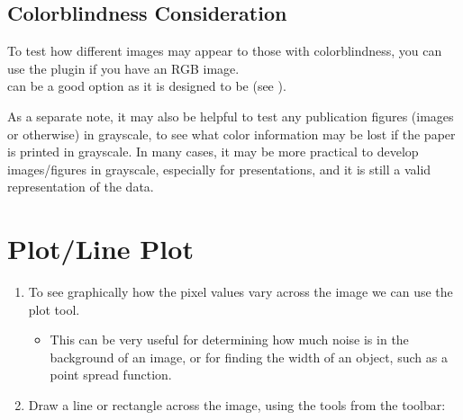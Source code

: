 \documentclass[letterpaper,10pt,english]{jupyterBook}
\begin{document}
\subsection{Colorblindness Consideration}
\label{\detokenize{basics:colorblindness-consideration}}
\sphinxAtStartPar
To test how different images may appear to those with colorblindness, you can use the  plugin if you have an RGB image.\\
 can be a good option as it is designed to be  (see ).

\sphinxAtStartPar
As a separate note, it may also be helpful to test any publication figures (images or
otherwise) in grayscale, to see what color information may be lost if the paper is printed in
grayscale.  In many cases, it may be more practical to develop images/figures in grayscale,
especially for presentations, and it is still a valid representation of the data.


\section{Plot/Line Plot}
\label{\detokenize{basics:plot-line-plot}}\begin{enumerate}
%
\item {} 
\sphinxAtStartPar
To see graphically how the pixel values vary across the image we can use the plot tool.
\begin{itemize}
\item {} 
\sphinxAtStartPar
This can be very useful for determining how much noise is in the background of an
image, or for finding the width of an object, such as a point spread function.

\end{itemize}

\item {} 
\sphinxAtStartPar
Draw a line or rectangle across the image, using the tools from the toolbar:

\end{enumerate}
\end{document}

